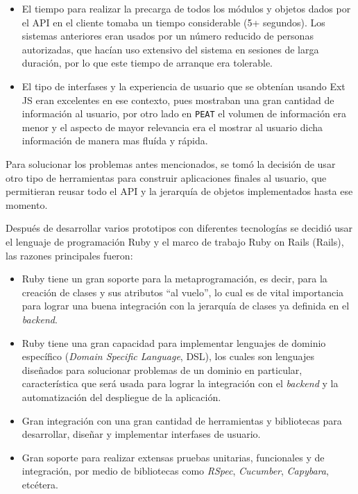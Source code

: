 \begin{itemize}
\item El tiempo para realizar la precarga de todos los módulos y
  objetos dados por el API en el cliente tomaba un tiempo
  considerable (5+ segundos). Los sistemas anteriores eran usados
  por un número reducido de personas autorizadas, que hacían uso
  extensivo del sistema en sesiones de larga duración, por lo
  que este tiempo de arranque era tolerable.
\item El tipo de interfases y la experiencia de usuario que se obtenían
  usando Ext JS eran excelentes en ese contexto, pues mostraban una gran
  cantidad de información al usuario, por otro lado en \texttt{PEAT}
  el volumen de información era menor y el aspecto de mayor relevancia
  era el mostrar al usuario dicha información de manera mas fluída y rápida.
\end{itemize}

Para solucionar los problemas antes mencionados, se tomó la decisión de
usar otro tipo de herramientas para construir aplicaciones finales al usuario,
que permitieran reusar todo el API y la jerarquía de objetos implementados
hasta ese momento.

Después de desarrollar varios prototipos con diferentes tecnologías se decidió
usar el lenguaje de programación Ruby y el marco de trabajo Ruby on Rails (Rails),
las razones principales fueron:

\begin{itemize}
\item Ruby tiene un gran soporte para la metaprogramación, es decir, para la
  creación de clases y sus atributos ``al vuelo'', lo cual es de vital
  importancia para lograr una buena integración con la jerarquía de clases
  ya definida en el \textit{backend}.
\item Ruby tiene una gran capacidad para implementar lenguajes de dominio
  específico (\textit{Domain Specific Language}, DSL), los cuales son lenguajes
  diseñados para solucionar problemas de un dominio en particular, característica
  que será usada para lograr la integración con el \textit{backend}
  y la automatización del despliegue de la aplicación.
\item Gran integración con una gran cantidad de herramientas y bibliotecas para
  desarrollar, diseñar y implementar interfases de usuario.
\item Gran soporte para realizar extensas pruebas unitarias, funcionales
  y de integración, por medio de bibliotecas como \textit{RSpec}, \textit{Cucumber},
  \textit{Capybara}, etcétera.
\end{itemize}

